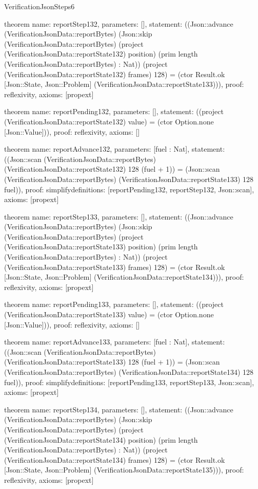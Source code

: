 \begin{lexlean}{VerificationJsonSteps6}
\begin{semanticmodule}
theorem{
  name: reportStep132,
  parameters: [],
  statement: ((Json::advance (VerificationJsonData::reportBytes) (Json::skip (VerificationJsonData::reportBytes) (project (VerificationJsonData::reportState132) position) (prim length (VerificationJsonData::reportBytes) : Nat)) (project (VerificationJsonData::reportState132) frames) 128) = (ctor Result.ok [Json::State, Json::Problem] (VerificationJsonData::reportState133))),
  proof: reflexivity{},
  axioms: [propext]
}

theorem{
  name: reportPending132,
  parameters: [],
  statement: ((project (VerificationJsonData::reportState132) value) = (ctor Option.none [Json::Value])),
  proof: reflexivity{},
  axioms: []
}

theorem{
  name: reportAdvance132,
  parameters: [fuel : Nat],
  statement: ((Json::scan (VerificationJsonData::reportBytes) (VerificationJsonData::reportState132) 128 (fuel + 1)) = (Json::scan (VerificationJsonData::reportBytes) (VerificationJsonData::reportState133) 128 fuel)),
  proof: simplify{definitions: [reportPending132, reportStep132, Json::scan]},
  axioms: [propext]
}

theorem{
  name: reportStep133,
  parameters: [],
  statement: ((Json::advance (VerificationJsonData::reportBytes) (Json::skip (VerificationJsonData::reportBytes) (project (VerificationJsonData::reportState133) position) (prim length (VerificationJsonData::reportBytes) : Nat)) (project (VerificationJsonData::reportState133) frames) 128) = (ctor Result.ok [Json::State, Json::Problem] (VerificationJsonData::reportState134))),
  proof: reflexivity{},
  axioms: [propext]
}

theorem{
  name: reportPending133,
  parameters: [],
  statement: ((project (VerificationJsonData::reportState133) value) = (ctor Option.none [Json::Value])),
  proof: reflexivity{},
  axioms: []
}

theorem{
  name: reportAdvance133,
  parameters: [fuel : Nat],
  statement: ((Json::scan (VerificationJsonData::reportBytes) (VerificationJsonData::reportState133) 128 (fuel + 1)) = (Json::scan (VerificationJsonData::reportBytes) (VerificationJsonData::reportState134) 128 fuel)),
  proof: simplify{definitions: [reportPending133, reportStep133, Json::scan]},
  axioms: [propext]
}

theorem{
  name: reportStep134,
  parameters: [],
  statement: ((Json::advance (VerificationJsonData::reportBytes) (Json::skip (VerificationJsonData::reportBytes) (project (VerificationJsonData::reportState134) position) (prim length (VerificationJsonData::reportBytes) : Nat)) (project (VerificationJsonData::reportState134) frames) 128) = (ctor Result.ok [Json::State, Json::Problem] (VerificationJsonData::reportState135))),
  proof: reflexivity{},
  axioms: [propext]
}


\end{semanticmodule}
\end{lexlean}
